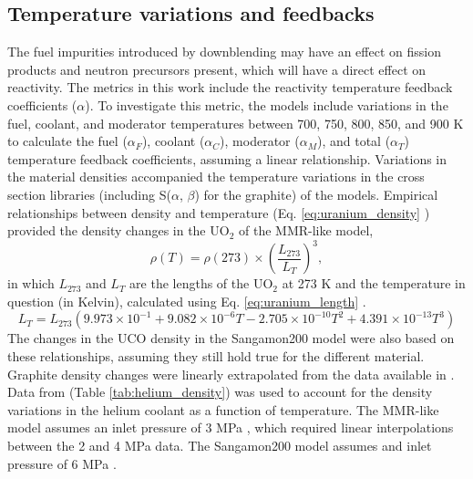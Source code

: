 \subsection{Temperature variations and feedbacks}
The fuel impurities introduced by downblending may have an effect on 
fission products and neutron precursors present, which will have 
a direct effect on reactivity. 
The metrics in this work include the reactivity temperature feedback 
coefficients ($\alpha$). To investigate this metric, the models include 
variations in the fuel, coolant, and moderator temperatures 
between 700, 750, 800, 850, and 900 K to calculate the fuel 
($\alpha_F$), coolant ($\alpha_C$), moderator ($\alpha_M$), 
and total ($\alpha_T$) temperature feedback coefficients, assuming a linear 
relationship. Variations in the material densities accompanied the 
temperature variations in the cross section libraries 
(including S($\alpha$, $\beta$) for the graphite) of 
the models. Empirical relationships 
between density and temperature (Eq. \ref{eq:uranium_density} 
\cite{fink_thermophysical_2000}) provided the density 
changes in the UO$_2$ of the \gls*{MMR}-like model,
\begin{equation}\label{eq:uranium_density}
    \rho(T) = \rho(273)\times\left(\frac{L_{273}}{L_T}\right)^3,
\end{equation}
in which $L_{273}$ and $L_T$ are the lengths of the UO$_2$ at 
273 K and the temperature in question (in Kelvin), calculated 
using Eq. \ref{eq:uranium_length} \cite{fink_thermophysical_2000}.
\begin{equation}\label{eq:uranium_length}
    L_T = L_{273}(9.973\times10^{-1} + 9.082\times10^{-6}T
    -2.705\times10^{-10}T^2 + 4.391\times10^{-13}T^3)
\end{equation}
The changes in 
the UCO density in the Sangamon200 model were also based on 
these relationships, assuming they still hold true for the 
different material. 
Graphite density changes were linearly extrapolated from the 
data available in \cite{mceligot_thermal_2016}. 
Data from \cite{petersen_properties_1970} (Table 
\ref{tab:helium_density}) was used to account for the density 
variations in the helium coolant as a function of temperature. 
The \gls*{MMR}-like model assumes an inlet pressure of 3 MPa 
\cite{noauthor_usnc_2021}, which required linear interpolations 
between the 2 and 4 MPa data. The Sangamon200 model assumes 
and inlet pressure of 6 MPa \cite{mulder_overview_2021}.


